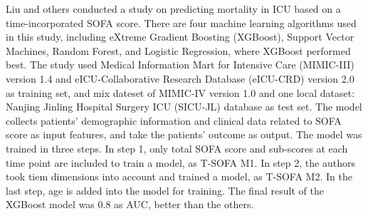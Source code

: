 \documentclass[12pt,a4paper,english
]{tunithesis}
\begin{document}
Liu and others conducted a study on predicting mortality in ICU based on a time-incorporated SOFA score.\parencite{liu2022} There are four machine learning algorithms used in this study, including eXtreme Gradient Boosting (XGBoost), Support Vector Machines, Random Forest, and Logistic Regression, where XGBoost performed best. The study used Medical Information Mart for Intensive Care (MIMIC-III) version 1.4 and eICU-Collaborative Research Database (eICU-CRD) version 2.0 as training set, and mix dateset of MIMIC-IV version 1.0 and one local dataset: Nanjing Jinling Hospital Surgery ICU (SICU-JL) database as test set. The model collects patients' demographic information and clinical data related to SOFA score as input features, and take the patients' outcome as output. The model was trained in three steps. In step 1, only total SOFA score and sub-scores at each time point are included to train a model, as T-SOFA M1. In step 2, the authors took tiem dimensions into account and trained a model, as T-SOFA M2. In the last step, age is added into the model for training. The final result of the XGBoost model was 0.8 as AUC, better than the others.
\end{document}
